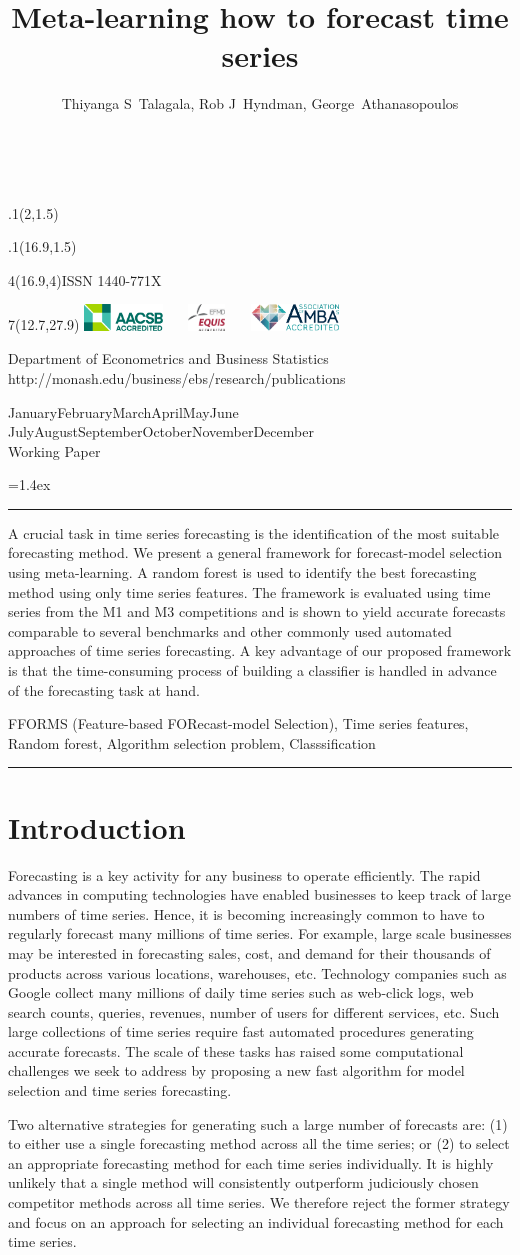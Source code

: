 \documentclass[11pt,a4paper,]{article}
\title{Meta-learning how to forecast time series}
\author{Thiyanga S~Talagala, Rob J~Hyndman, George~Athanasopoulos}
\date{\sf\Date~\Month~\Year}
\makeatletter
\def\Date{\number\day}
\def\Month{\ifcase\month\or
 January\or February\or March\or April\or May\or June\or
 July\or August\or September\or October\or November\or December\fi}
\def\Year{\number\year}
\def\showjel{{\large\textsf{\textbf{JEL classification:}}~\@jel}}
\def\cover{{\sffamily\setcounter{page}{0}
        \thispagestyle{empty}
        \placefig{2}{1.5}{width=5cm}{monash2}
        \placefig{16.9}{1.5}{width=2.1cm}{MBusSchool}
        \begin{textblock}{4}(16.9,4)ISSN 1440-771X\end{textblock}
        \begin{textblock}{7}(12.7,27.9)\hfill
        \includegraphics[height=0.7cm]{AACSB}~~~
        \includegraphics[height=0.7cm]{EQUIS}~~~
        \includegraphics[height=0.7cm]{AMBA}
        \end{textblock}
        \vspace*{2cm}
        \begin{center}\Large
        Department of Econometrics and Business Statistics\\[.5cm]
        \footnotesize http://monash.edu/business/ebs/research/publications
        \end{center}\vspace{2cm}
        \begin{center}
        \fbox{\parbox{14cm}{\begin{onehalfspace}\centering\Huge\vspace*{0.3cm}
                \textsf{\textbf{\expandafter{\@title}}}\vspace{1cm}\par
                \LARGE\@author\end{onehalfspace}
        }}
        \end{center}
        \vfill
                \begin{center}\Large
                \Month~\Year\\[1cm]
                Working Paper \@wp
        \end{center}\vspace*{2cm}}}
\def\pageone{{\sffamily\setstretch{1}%
        \thispagestyle{empty}%
        \vbox to \textheight{%
        \raggedright\baselineskip=1.2cm
     {\fontsize{24.88}{30}\sffamily\textbf{\expandafter{\@title}}}
        \vspace{2cm}\par
        \hspace{1cm}\parbox{14cm}{\sffamily\large\@addresses}\vspace{1cm}\vfill
        \hspace{1cm}{\large\Date~\Month~\Year}\\[1cm]
        \hspace{1cm}\showjel\vss}}}
\def\blindtitle{{\sffamily
     \thispagestyle{plain}\raggedright\baselineskip=1.2cm
     {\fontsize{24.88}{30}\sffamily\textbf{\expandafter{\@title}}}\vspace{1cm}\par
        }}
\def\titlepage{{\cover\newpage\pageone\newpage\blindtitle}}
\let\maketitle\titlepage
\newenvironment{keywords}{\par\vspace{0.5cm}\noindent{\sffamily\textbf{Keywords:}}}{\vspace{0.25cm}\par\hrule\vspace{0.5cm}\par}
\renewenvironment{abstract}{\begin{minipage}{\textwidth}\parskip=1.4ex\noindent
\hrule\vspace{0.1cm}\par{\sffamily\textbf{\abstractname}}\newline}
  {\end{minipage}}
\def\placefig#1#2#3#4{\begin{textblock}{.1}(#1,#2)\rlap{\texttt{[image: \#4]}}\end{textblock}}
\makeatother
\begin{document}
\maketitle
\begin{abstract}
A crucial task in time series forecasting is the identification of the most suitable forecasting method. We present a general framework for forecast-model selection using meta-learning. A random forest is used to identify the best forecasting method using only time series features. The framework is evaluated using time series from the M1 and M3 competitions and is shown to yield accurate forecasts comparable to several benchmarks and other commonly used automated approaches of time series forecasting. A key advantage of our proposed framework is that the time-consuming process of building a classifier is handled in advance of the forecasting task at hand.
\end{abstract}
\begin{keywords}
FFORMS (Feature-based FORecast-model Selection), Time series features, Random forest, Algorithm selection problem, Classsification
\end{keywords}

\hypertarget{intro}{%
\section{Introduction}\label{intro}}

Forecasting is a key activity for any business to operate efficiently. The rapid advances in computing technologies have enabled businesses to keep track of large numbers of time series. Hence, it is becoming increasingly common to have to regularly forecast many millions of time series. For example, large scale businesses may be interested in forecasting sales, cost, and demand for their thousands of products across various locations, warehouses, etc. Technology companies such as Google collect many millions of daily time series such as web-click logs, web search counts, queries, revenues, number of users for different services, etc. Such large collections of time series require fast automated procedures generating accurate forecasts. The scale of these tasks has raised some computational challenges we seek to address by proposing a new fast algorithm for model selection and time series forecasting.

Two alternative strategies for generating such a large number of forecasts are: (1) to either use a single forecasting method across all the time series; or (2) to select an appropriate forecasting method for each time series individually. It is highly unlikely that a single method will consistently outperform judiciously chosen competitor methods across all time series. We therefore reject the former strategy and focus on an approach for selecting an individual forecasting method for each time series.
\end{document}
